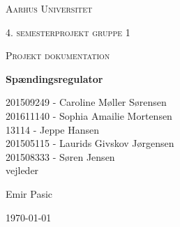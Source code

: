 \thispagestyle{empty}
{\centering
	{\scshape\LARGE Aarhus Universitet \par}
	\vspace{1cm}
	{\scshape\Large 4. semesterprojekt gruppe 1\par}
	{\scshape\Large Projekt dokumentation\par}
	\vspace{1.5cm}
	{\huge\bfseries Spændingsregulator\par}
	\vspace{2cm}
	{\Large
		201509249 - Caroline Møller Sørensen\\
		201611140 - Sophia Amailie Mortensen\\
		13114 - Jeppe Hansen\\ 
		201505115 - Laurids Givskov Jørgensen\\
		201508333 - Søren Jensen\\  }
	\vfill
	vejleder\par
	Emir Pasic
	
	\vfill
	
	{\large \today\par}
	\par}



